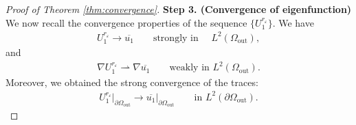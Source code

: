 \documentclass[12pt,reqno]{amsart}
\numberwithin{equation}{section}
\numberwithin{theorem}{section}
\numberwithin{equation}{section}
\numberwithin{theorem}{section}
\begin{document}
\begin{proof}[Proof of Theorem \ref{thm:convergence}]
 \textbf{Step 3. (Convergence of eigenfunction)}  
We now recall the convergence properties of the sequence 
$\{U_1^{r_\varepsilon}\}$.  
 We have
\begin{align*}
   U_1^{r_\varepsilon} \longrightarrow \overline{u_1}
    \qquad \text{strongly in } \quad L^{2}(\Omega_{\mathrm{out}}), 
\end{align*}
and 
\begin{align*}
\nabla U_1^{r_\varepsilon} \rightharpoonup 
\nabla \overline{u_1}
    \qquad \text{weakly in } L^{2}(\Omega_{\mathrm{out}}).
\end{align*}
Moreover, we obtained the strong convergence of the traces:
\begin{align*}
  U_1^{r_\varepsilon}\big|_{\partial\Omega_{\mathrm{out}}}
\longrightarrow \overline{u_1}\big|_{\partial\Omega_{\mathrm{out}}}
    \qquad \text{in } L^{2}(\partial\Omega_{\mathrm{out}}).  
\end{align*}


\end{proof}
\end{document}
